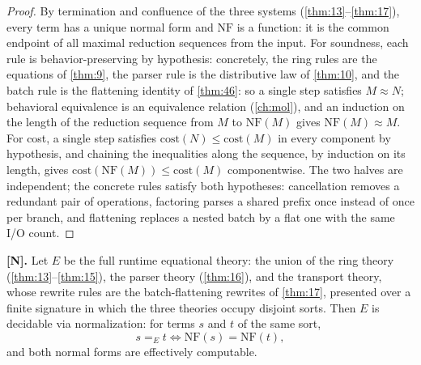 \begin{proof}
By termination and confluence of the three systems (\autoref{thm:13}--\autoref{thm:17}), every term
has a unique normal form and $\mathrm{NF}$ is a function: it is the common
endpoint of all maximal reduction sequences from the input. For soundness,
each rule is behavior-preserving by hypothesis: concretely, the ring
rules are the equations of \autoref{thm:9}, the parser rule is the
distributive law of \autoref{thm:10}, and the batch rule is the flattening
identity of \autoref{thm:46}: so a single step satisfies $M \approx N$;
behavioral equivalence is an equivalence relation (\autoref{ch:mol}), and an
induction on the length of the reduction sequence from $M$ to
$\mathrm{NF} (M)$ gives $\mathrm{NF} (M) \approx M$. For cost, a single step
satisfies $\mathrm{cost} (N) \leq \mathrm{cost} (M)$ in every component by
hypothesis, and chaining the inequalities along the sequence, by induction
on its length, gives $\mathrm{cost} (\mathrm{NF} (M)) \leq \mathrm{cost} (M)$
componentwise. The two halves are independent; the concrete rules satisfy
both hypotheses: cancellation removes a redundant pair of operations,
factoring parses a shared prefix once instead of once per branch, and
flattening replaces a nested batch by a flat one with the same I/O count.
\end{proof}

\begin{theorem}\label{thm:19}
\textbf{[N].} Let $E$ be the full runtime equational theory: the union of
the ring theory (\autoref{thm:13}--\autoref{thm:15}), the parser theory
(\autoref{thm:16}), and the transport theory, whose rewrite rules are the
batch-flattening rewrites of \autoref{thm:17}, presented over a finite
signature in which the three theories occupy disjoint sorts. Then $E$ is
decidable via normalization: for terms $s$ and $t$ of the same sort,
\[
s =_E t \iff \mathrm{NF} (s) = \mathrm{NF} (t),
\]
and both normal forms are effectively computable.
\end{theorem}

